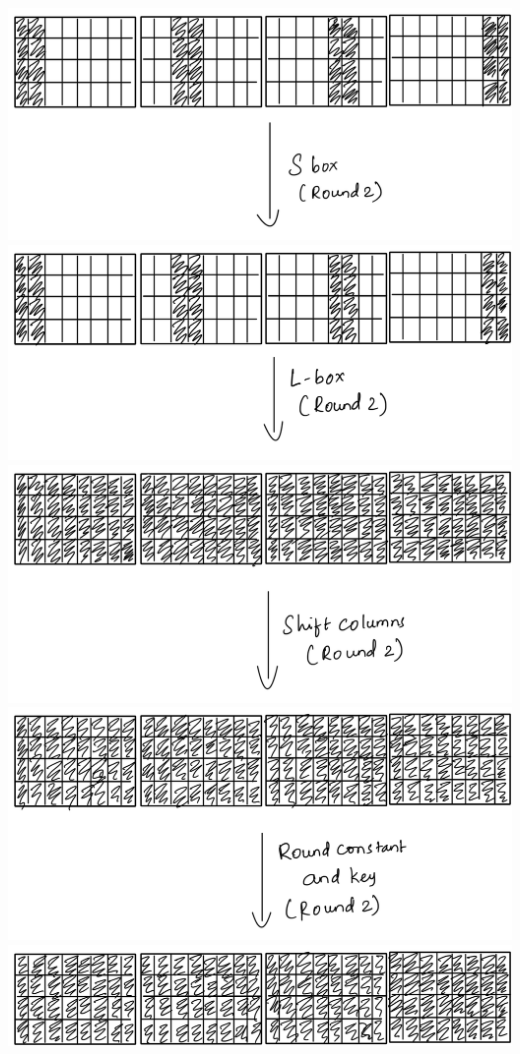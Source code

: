 \documentclass[preprint]{transcrypto}
\begin{document}
\begin{center}
    \includegraphics[scale=0.1]{PNG image-4.png}\\
    \includegraphics[scale=0.1]{PNG image-5.png}\\
    \includegraphics[scale=0.1]{PNG image-6.png}\\
    \includegraphics[scale=0.1]{PNG image-7.png}\\
    \includegraphics[scale=0.1]{PNG image-8.png}\\
\end{center}
\end{document}
